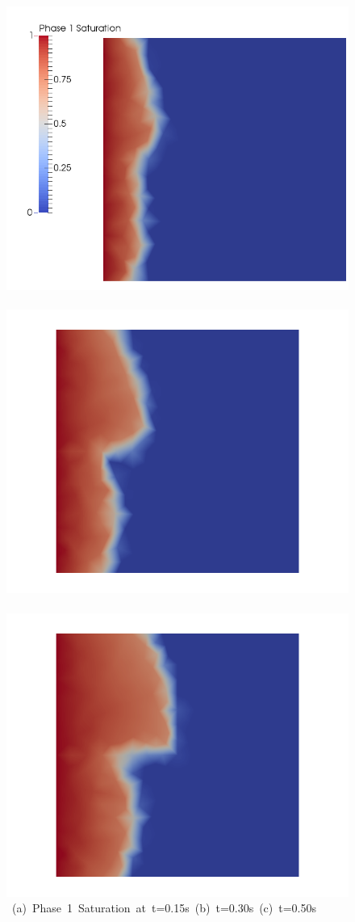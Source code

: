 \begin{landscape}
\begin{figure}[ht] 
\vbox{\vspace{-1cm}
\hspace{0.0cm} \hbox{\includegraphics[width=.56\textwidth]{./Pics/PDFCase/PDFCase_Saturation_t_dot15.png}
      \includegraphics[width=.56\textwidth]{./Pics/PDFCase/PDFCase_Saturation_t_dot30.png}
      \includegraphics[width=.56\textwidth]{./Pics/PDFCase/PDFCase_Saturation_t_dot50.png}}
\vspace{0.cm}
\hbox{\hspace{0.5cm} (a) Phase 1 Saturation at t=0.15s \hspace{3.75cm} (b) t=0.30s \hspace{5.0cm} (c) t=0.50s}
}
\end{figure}
\end{landscape}
